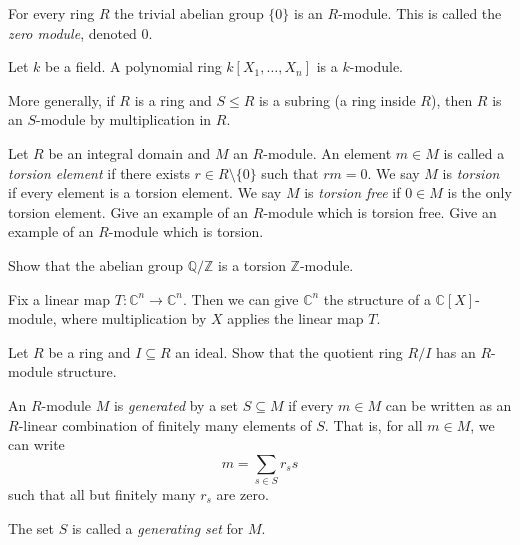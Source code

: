 \documentclass[a4paper,11pt]{article}
\begin{document}
    \begin{example}
      For every ring \(R\) the trivial abelian group \(\{0\}\) is an \(R\)-module. This is called the \emph{zero module}, denoted \(0\).
    \end{example}

    \begin{example}
      Let \(k\) be a field. A polynomial ring \(k[X_1, \dots, X_n]\) is a \(k\)-module.
    \end{example}

    \begin{example}
      More generally, if \(R\) is a ring and \(S \le R\) is a subring (a ring inside \(R\)), then \(R\) is an \(S\)-module by multiplication in \(R\).
    \end{example}

    \begin{exercise}
      Let \(R\) be an integral domain and \(M\) an \(R\)-module. An element \(m \in M\) is called a \emph{torsion element} if there exists \(r \in R \setminus \{0\}\) such that \(rm = 0\). We say \(M\) is \emph{torsion} if every element is a torsion element. We say \(M\) is \emph{torsion free} if \(0 \in M\) is the only torsion element. Give an example of an \(R\)-module which is torsion free. Give an example of an \(R\)-module which is torsion.
    \end{exercise}

    \begin{exercise}
      Show that the abelian group \(\mathbb{Q}/\mathbb{Z}\) is a torsion \(\mathbb{Z}\)-module.
    \end{exercise}

    \begin{example}
      Fix a linear map \(T: \mathbb{C}^n \to \mathbb{C}^n\). Then we can give \(\mathbb{C}^n\) the structure of a \(\mathbb{C}[X]\)-module, where multiplication by \(X\) applies the linear map \(T\).
    \end{example}

    \begin{exercise}
      Let \(R\) be a ring and \(I \subseteq R\) an ideal. Show that the quotient ring \(R/I\) has an \(R\)-module structure.
    \end{exercise}

    \begin{definition}
      An \(R\)-module \(M\) is \emph{generated} by a set \(S \subseteq M\) if every \(m \in M\) can be written as an \(R\)-linear combination of finitely many elements of \(S\). That is, for all \(m \in M\), we can write
      \[
        m = \sum_{s \in S} r_s s
      \]
      such that all but finitely many \(r_s\) are zero.

      The set \(S\) is called a \emph{generating set} for \(M\).
    \end{definition}
\end{document}
